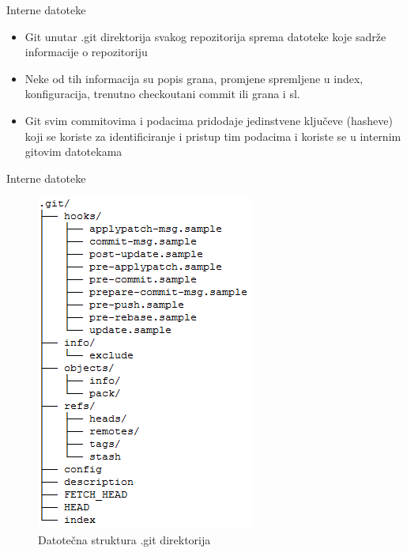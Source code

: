 \begin{frame}{Interne datoteke}
	\begin{itemize}
		\item{Git unutar .git direktorija svakog repozitorija sprema datoteke koje sadrže informacije o repozitoriju}
		\item{Neke od tih informacija su popis grana, promjene spremljene u index, konfiguracija, trenutno checkoutani commit ili grana i sl.}
		\item{Git svim commitovima i podacima pridodaje jedinstvene ključeve (hasheve) koji se koriste za identificiranje i pristup tim podacima i koriste se u internim gitovim datotekama}
	\end{itemize}
\end{frame}
\begin{frame}{Interne datoteke}
	\begin{figure}
		\centering
		\includegraphics[scale=0.6]{img/dir_structure.png}
		\caption{Datotečna struktura .git direktorija}
	\end{figure}
\end{frame}
